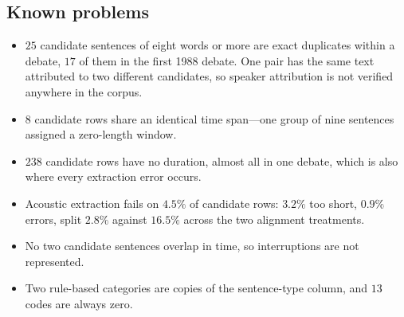 \documentclass[journal]{IEEEtran}
\begin{document}
\subsection*{Known problems}
\begin{itemize}\itemsep1pt
  \item $25$ candidate sentences of eight words or more are exact duplicates
        within a debate, $17$ of them in the first 1988 debate. One pair has
        the same text attributed to two different candidates, so speaker
        attribution is not verified anywhere in the corpus.
  \item $8$ candidate rows share an identical time span---one group of nine
        sentences assigned a zero-length window.
  \item $238$ candidate rows have no duration, almost all in one debate, which
        is also where every extraction error occurs.
  \item Acoustic extraction fails on $4.5\%$ of candidate rows: $3.2\%$ too
        short, $0.9\%$ errors, split $2.8\%$ against $16.5\%$ across the two
        alignment treatments.
  \item No two candidate sentences overlap in time, so interruptions are not
        represented.
  \item Two rule-based categories are copies of the sentence-type column, and
        $13$ codes are always zero.
\end{itemize}



\end{document}
